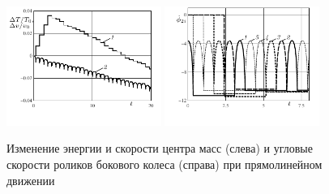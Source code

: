 \begin{figure}[h]
  \includegraphics[width=0.45\textwidth]{pic/figure6_1.pdf}
  \includegraphics[width=0.45\textwidth]{pic/figure6_2.pdf}
  \caption{Изменение энергии и скорости центра масс (слева) и угловые скорости роликов бокового колеса (справа) при прямолинейном движении}\label{fig:straight}
\end{figure}

